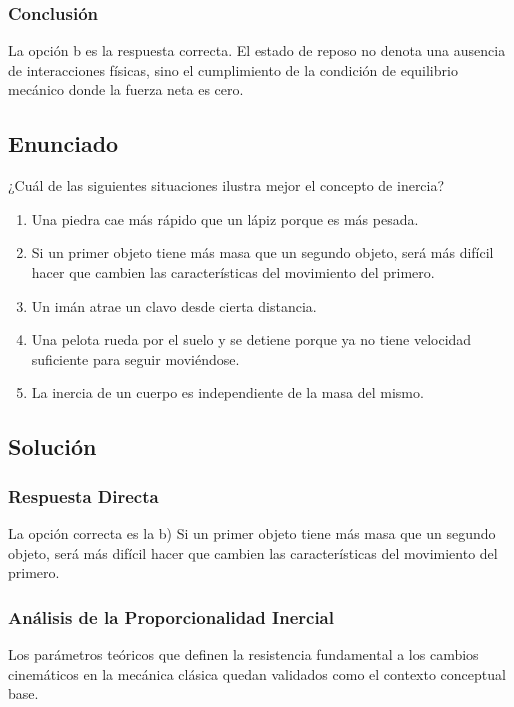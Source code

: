 \documentclass[12pt, a4paper]{article}
\begin{document}
\subsubsection*{Conclusión}
La opción b es la respuesta correcta. El estado de reposo no denota una ausencia de interacciones físicas, sino el cumplimiento de la condición de equilibrio mecánico donde la fuerza neta es cero.

\newpage

\subsection*{Enunciado}
¿Cuál de las siguientes situaciones ilustra mejor el concepto de inercia?
\begin{enumerate}
    \item[a)] Una piedra cae más rápido que un lápiz porque es más pesada.
    \item[b)] Si un primer objeto tiene más masa que un segundo objeto, será más difícil hacer que cambien las características del movimiento del primero.
    \item[c)] Un imán atrae un clavo desde cierta distancia.
    \item[d)] Una pelota rueda por el suelo y se detiene porque ya no tiene velocidad suficiente para seguir moviéndose.
    \item[e)] La inercia de un cuerpo es independiente de la masa del mismo.
\end{enumerate}

\subsection*{Solución}

\subsubsection*{Respuesta Directa}
La opción correcta es la b) Si un primer objeto tiene más masa que un segundo objeto, será más difícil hacer que cambien las características del movimiento del primero.

\subsubsection*{Análisis de la Proporcionalidad Inercial}
Los parámetros teóricos que definen la resistencia fundamental a los cambios cinemáticos en la mecánica clásica quedan validados como el contexto conceptual base. 
\end{document}
